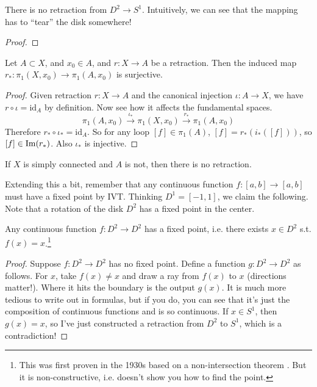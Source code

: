   \begin{theorem}
    There is no retraction from $D^2 \to S^1$. Intuitively, we can see that the mapping has to ``tear'' the disk somewhere!
  \end{theorem}
  \begin{proof}
    
  \end{proof}

  \begin{theorem}
    Let $A \subset X$, and $x_0 \in A$, and $r: X \to A$ be a retraction. Then the induced map $r_\ast: \pi_1 (X, x_0) \to \pi_1 (A, x_0)$ is surjective. 
  \end{theorem}
  \begin{proof}
    Given retraction $r: X \to A$ and the canonical injection $\iota: A \to X$, we have $r \circ \iota = \mathrm{id}_A$ by definition. Now see how it affects the fundamental spaces. 
    \begin{equation}
      \pi_1 (A, x_0) \xrightarrow{\iota_\ast} \pi_1 (X, x_0) \xrightarrow{r_\ast} \pi_1 (A, x_0)
    \end{equation}
    Therefore $r_\ast \circ \iota_\ast = \mathrm{id}_A$. So for any loop $[f] \in \pi_1 (A)$, $[f] = r_\ast (i_\ast ([f]))$, so $[f] \in \im(r_\ast)$. Also $\iota_\ast$ is injective. 
  \end{proof}

  \begin{corollary}
    If $X$ is simply connected and $A$ is not, then there is no retraction. 
  \end{corollary}

  Extending this a bit, remember that any continuous function $f: [a, b] \to [a, b]$ must have a fixed point by IVT. Thinking $D^1 = [-1, 1]$, we claim the following. Note that a rotation of the disk $D^2$ has a fixed point in the center. 

  \begin{theorem}
    Any continuous function $f: D^2 \to D^2$ has a fixed point, i.e. there exists $x \in D^2$ s.t. $f(x) = x$.\footnote{This was first proven in the 1930s based on a non-intersection theorem . But it is non-constructive, i.e. doesn't show you how to find the point. }
  \end{theorem}
  \begin{proof}
    Suppose $f: D^2 \to D^2$ has no fixed point. Define a function $g: D^2 \to D^2$ as follows. For $x$, take $f(x) \neq x$ and draw a ray from $f(x)$ to $x$ (directions matter!). Where it hits the boundary is the output $g(x)$. It is much more tedious to write out in formulas, but if you do, you can see that it's just the composition of continuous functions and is so continuous. If $x \in S^1$, then $g(x) = x$, so I've just constructed a retraction from $D^2$ to $S^1$, which is a contradiction! 
  \end{proof}

